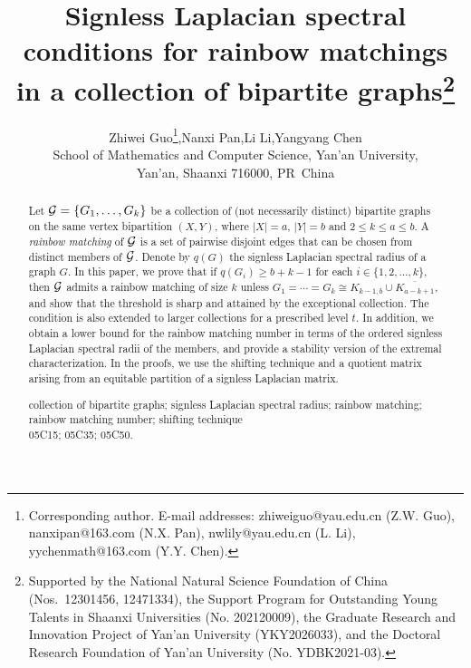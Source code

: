 \documentclass[11pt,a4paper]{article}
\theoremstyle{definition}
\numberwithin{equation}{section}
\begin{document}
\title
{\bf\Large Signless Laplacian spectral conditions for rainbow matchings in a collection of bipartite graphs\thanks{Supported by the National Natural Science Foundation of China (Nos.~12301456, 12471334), the Support Program for Outstanding Young Talents in Shaanxi Universities (No. 202120009), the Graduate Research and Innovation Project of Yan'an University (YKY2026033), and the Doctoral Research Foundation of Yan'an University (No. YDBK2021-03).}
}

\date{}
\author{
\small Zhiwei Guo\thanks{Corresponding author.\newline
\small E-mail addresses: zhiweiguo@yau.edu.cn (Z.W. Guo),
\small nanxipan@163.com (N.X. Pan), nwlily@yau.edu.cn (L. Li),
\small yychenmath@163.com (Y.Y. Chen).},\quad Nanxi Pan,\quad Li Li,\quad \small Yangyang Chen\\[2mm]
\small School of Mathematics and Computer Science, Yan'an
\small University,\\
\small Yan'an, Shaanxi 716000, PR~China\\[0.3cm]}
\maketitle

\begin{abstract}
Let ${\cal G}=\{G_1,\ldots,G_k\}$ be a collection of (not necessarily distinct) bipartite graphs on the same vertex bipartition $(X,Y)$, where $|X|=a$, $|Y|=b$ and $2\le k\le a\le b$. A \emph{rainbow matching} of ${\cal G}$ is a set of pairwise disjoint edges that can be chosen from distinct members of ${\cal G}$. Denote by $q(G)$ the signless Laplacian spectral radius of a graph $G$. In this paper, we prove that if $q(G_i)\ge b+k-1$ for each $i\in\{1,2,\ldots,k\}$, then ${\cal G}$ admits a rainbow matching of size $k$ unless $G_1=\cdots=G_k\cong K_{k-1,b}\cup\overline{K_{a-k+1}}$, and show that the threshold is sharp and attained by the exceptional collection. The condition is also extended to larger collections for a prescribed level $t$. In addition, we obtain a lower bound for the rainbow matching number in terms of the ordered signless Laplacian spectral radii of the members, and provide a stability version of the extremal characterization. In the proofs, we use the shifting technique and a quotient matrix arising from an equitable partition of a signless Laplacian matrix.
\medskip

 collection of bipartite graphs; signless Laplacian spectral radius; rainbow matching; rainbow matching number; shifting technique\\
 05C15; 05C35; 05C50.
\smallskip
\end{abstract}
\end{document}
